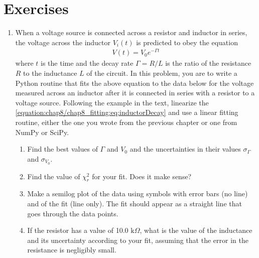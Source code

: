 \documentclass[letterpaper,10pt,english]{sphinxmanual}
\begin{document}
\newpage


\section{Exercises}
\label{\detokenize{chap8/chap8_fitting:exercises}}\begin{enumerate}
%
\item {} 
\sphinxAtStartPar
When a voltage source is connected across a resistor and inductor in series, the voltage across the inductor \(V_i(t)\) is predicted to obey the equation
\begin{equation}\label{equation:chap8/chap8_fitting:eq:inductorDecay}
\begin{split}V(t) = V_0 e^{-\Gamma t}\end{split}
\end{equation}
\sphinxAtStartPar
where \(t\) is the time and the decay rate \(\Gamma=R/L\) is the ratio of the  resistance \(R\) to the inductance \(L\) of the circuit.  In this problem, you are to write a Python routine that fits the above equation to the data below for the voltage measured across an inductor after it is connected in series with a resistor to a voltage source.  Following the example in the text, linearize the \eqref{equation:chap8/chap8_fitting:eq:inductorDecay} and use a linear fitting routine, either the one you wrote from the previous chapter or one from NumPy or SciPy.
\begin{enumerate}
%
\item {} 
\sphinxAtStartPar
Find the best values of \(\Gamma\) and \(V_0\) and the uncertainties in their values \(\sigma_\Gamma\) and \(\sigma_{V_0}\).

\item {} 
\sphinxAtStartPar
Find the value of \(\chi_r^2\) for your fit.  Does it make sense?

\item {} 
\sphinxAtStartPar
Make a semi\sphinxhyphen{}log plot of the data using symbols with error bars (no line) and of the fit (line only).  The fit should appear as a straight line that goes through the data points.

\item {} 
\sphinxAtStartPar
If the resistor has a value of 10.0 \(\mathrm{k}\Omega\), what is the value of the inductance and its uncertainty according to your fit, assuming that the error in the resistance is negligibly small.


\end{enumerate}
\end{enumerate}
\end{document}
